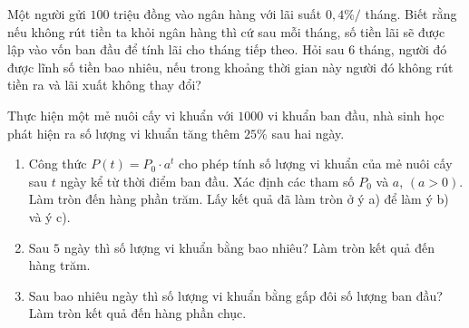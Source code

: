 \begin{ex}%
	Một người gửi $100$ triệu đồng vào ngân hàng với lãi suất $0{,}4\% /$ tháng. Biết rằng nếu không rút tiền ta khỏi ngân hàng thì cứ sau mỗi tháng, số tiền  lãi sẽ được lập vào vốn ban đầu để tính lãi cho tháng tiếp theo. Hỏi sau $6$ tháng, người đó được lĩnh số tiền bao nhiêu, nếu trong khoảng thời gian này người đó không rút tiền ra và lãi xuất không thay đổi?
\end{ex}

\begin{ex}%
	Thực hiện một mẻ nuôi cấy vi khuẩn với $1000$ vi khuẩn ban đầu, nhà  sinh học phát hiện ra số lượng vi khuẩn tăng thêm $25 \%$ sau hai ngày.
	\begin{enumerate}
		\item Công thức $ P(t)= P_0 \cdot a^t$ cho phép tính số lượng vi khuẩn của mẻ nuôi cấy sau $t$ ngày kể từ thời điểm ban đầu. Xác định các tham số $P_0$ và $a$, $(a>0)$. Làm tròn đến hàng phần trăm. Lấy kết quả đã làm tròn ở ý a) để làm ý b) và ý c). 
		\item Sau $5$ ngày thì số lượng vi  khuẩn bằng bao nhiêu? Làm tròn kết quả đến hàng trăm.
		\item Sau bao nhiêu ngày thì số lượng  vi khuẩn bằng gấp đôi số lượng ban đầu? Làm tròn kết quả đến hàng phần chục.
	\end{enumerate}
\end{ex}

